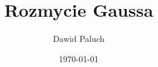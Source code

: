 \documentclass{article}
\begin{document}
\title{Rozmycie Gaussa}
\author{Dawid Paluch}
\date{\today}
\maketitle
\end{document}

